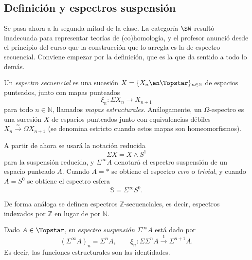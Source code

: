 \subsection{Definición y espectros suspensión}

Se pasa ahora a la segunda mitad de la clase. La categoría $\SW$ resultó inadecuada para representar teorías de (co)homología, y el profesor anunció desde el principio del curso que la construcción que lo arregla es la de espectro secuencial. Conviene empezar por la definición, que es la que da sentido a todo lo demás.

\begin{defi}\label{defi:espectro-secuencial}
Un \emph{espectro secuencial} es una sucesión $X=\{X_n\en\Topstar\}_{n\in\mathbb N}$
de espacios punteados, junto con mapas punteados
\[
\xi_n\colon\Sigma X_n\longrightarrow X_{n+1}
\]
para todo $n\in\mathbb N$, llamados \emph{mapas estructurales}. Análogamente, un $\Omega$-espectro es una sucesión $X$ de espacios punteados junto con equivalencias débiles $X_n \xrightarrow{\simeq}\Omega X_{n+1}$ (se denomina estricto cuando estos mapas son homeomorfismos).
\end{defi}

\begin{nota}
   A partir de ahora se usará la notación reducida
   \[
   \Sigma X=X\wedge S^1
   \]
   para la suspensión reducida, y $\Sigma^\infty A$ denotará el espectro suspensión de un espacio punteado $A$. Cuando $A=\ast$ se obtiene el espectro \emph{cero} o \emph{trivial}, y cuando $A=S^0$ se obtiene el espectro esfera
   \[
   \mathbb S=\Sigma^\infty S^0 .
   \]
\end{nota}

\begin{defi}\label{defi:espectro-z}
De forma análoga se definen espectros $\mathbb Z$-secuenciales, es decir, espectros indexados por $\mathbb Z$ en lugar de por $\mathbb N$.
\end{defi}

\begin{ejem}\label{ejem:suspension-espectro}
Dado $A\in\Topstar$, su \emph{espectro suspensión} $\Sigma^\infty A$ está dado por
\[
(\Sigma^\infty A)_n=\Sigma^nA,
\qquad
\xi_n\colon\Sigma\Sigma^nA\xrightarrow{\ 1\ }\Sigma^{n+1}A .
\]
Es decir, las funciones estructurales son las identidades.
\end{ejem}

